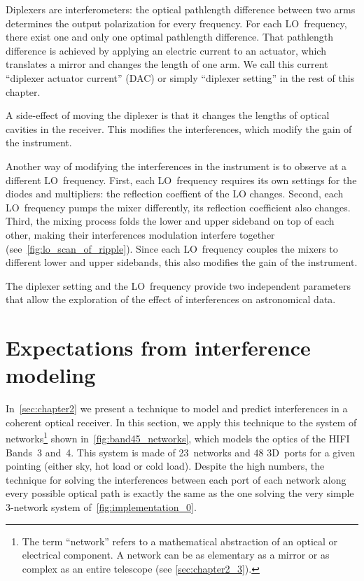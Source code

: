 Diplexers are interferometers: the optical pathlength difference between two arms determines the output polarization for every frequency.
For each LO~frequency, there exist one and only one optimal pathlength difference.
That pathlength difference is achieved by applying an electric current to an actuator, which translates a mirror and changes the length of one arm.
We call this current ``diplexer actuator current'' (DAC) or simply ``diplexer setting'' in the rest of this chapter.

A side-effect of moving the diplexer is that it changes the lengths of optical cavities in the receiver.
This modifies the interferences, which modify the gain of the instrument.

Another way of modifying the interferences in the instrument is to observe at a different LO~frequency.
First, each LO~frequency requires its own settings for the diodes and multipliers: the reflection coeffient of the LO changes.
Second, each LO~frequency pumps the mixer differently, its reflection coefficient also changes.
Third, the mixing process folds the lower and upper sideband on top of each other, making their interferences modulation interfere together (see~\vref{fig:lo_scan_of_ripple}).
Since each LO~frequency couples the mixers to different lower and upper sidebands, this also modifies the gain of the instrument.

The diplexer setting and the LO~frequency provide two independent parameters that allow the exploration of the effect of interferences on astronomical data.


\FloatBarrier
\section{Expectations from interference modeling}
\label{sec:s141_interf}
In~\cref{sec:chapter2} we present a technique to model and predict interferences in a coherent optical receiver.
In this section, we apply this technique to the system of networks\footnote{The term ``network'' refers to a mathematical abstraction of an optical or electrical component.
 A network can be as elementary as a mirror or as complex as an entire telescope (see \vref{sec:chapter2_3}).} shown in~\cref{fig:band45_networks}, which models the optics of the HIFI Bands~3 and~4.
This system is made of 23~networks and 48 3D~ports for a given pointing (either sky, hot load or cold load).
Despite the high numbers, the technique for solving the interferences between each port of each network along every possible optical path is exactly the same as the one solving the very simple 3-network system of~\vref{fig:implementation_0}.

